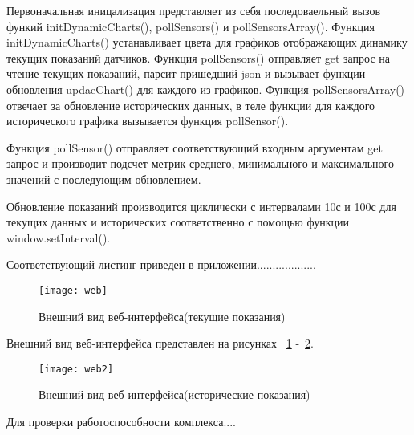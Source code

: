 Первоначальная иницализация представляет из себя последоваельный вызов функий initDynamicCharts(), pollSensors() и pollSensorsArray(). Функция initDynamicCharts() устанавливает цвета для графиков отображающих динамику текущих показаний датчиков.  Функция pollSensors() отправляет get запрос на чтение текущих показаний, парсит пришедший json и вызывает функции обновления updaeChart() для каждого из графиков. 
Функция pollSensorsArray() отвечает за обновление исторических данных, в теле функции для каждого исторического графика вызывается функция pollSensor(). 

Функция pollSensor() отправляет соответствующий входным аргументам get запрос и производит подсчет метрик среднего, минимального и максимального значений с последующим обновлением.

Обновление показаний производится циклически с интервалами 10с и 100с для текущих данных и исторических соответственно с помощью функции window.setInterval(). 

Соответствующий листинг приведен в приложении...................
\begin{figure}[h]
	\centering
	\texttt{[image: web]}
	\caption{Внешний вид веб-интерфейса(текущие показания)}
	\label{fig:web}
\end{figure}

Внешний вид веб-интерфейса представлен на рисунках ~\ref{fig:web} -~\ref{fig:web2}.

\begin{figure}[h]
	\centering
	\texttt{[image: web2]} 
	\caption{Внешний вид веб-интерфейса(исторические показания)}
	\label{fig:web2}
\end{figure}

Для проверки работоспособности комплекса....



%
%





